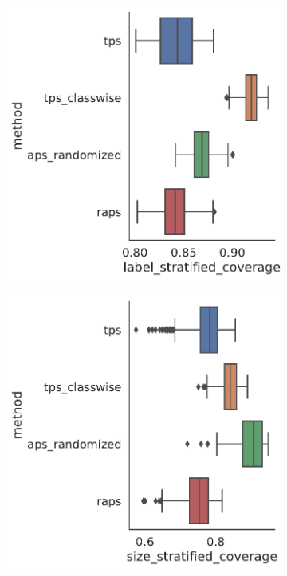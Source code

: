 \begin{figure}
    \begin{subfigure}{0.48\linewidth}
    \includegraphics[width=\linewidth,alt={Box plots for method comparison on Cora dataset label stratified coverage.}]{graphConformal/figures/split/cora_label_stratified_coverage.png}
    \end{subfigure}
    \begin{subfigure}{0.48\linewidth}
        \includegraphics[width=\linewidth,alt={Box plots for method comparison on Cora dataset size stratified coverage.}]{graphConformal/figures/split/cora_size_stratified_coverage.png} 

\end{subfigure}
\end{figure}
